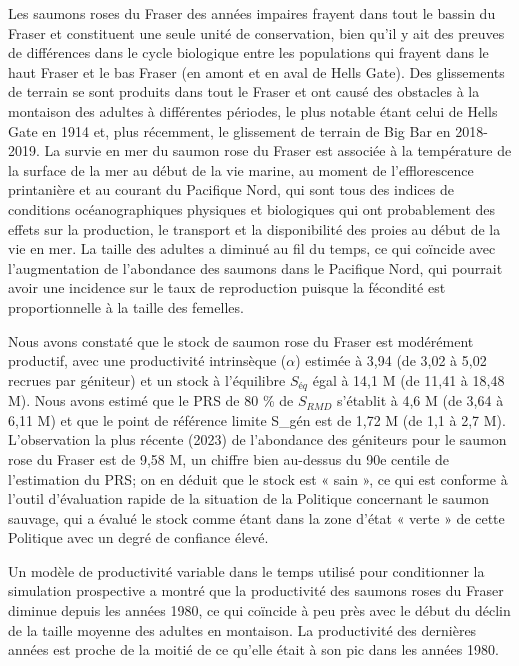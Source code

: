 \documentclass[french,11pt]{book}
\begin{document}
Les saumons roses du Fraser des années impaires frayent dans tout le bassin du Fraser et constituent une seule unité de conservation, bien qu'il y ait des preuves de différences dans le cycle biologique entre les populations qui frayent dans le haut Fraser et le bas Fraser (en amont et en aval de Hells Gate). Des glissements de terrain se sont produits dans tout le Fraser et ont causé des obstacles à la montaison des adultes à différentes périodes, le plus notable étant celui de Hells Gate en 1914 et, plus récemment, le glissement de terrain de Big Bar en 2018-2019. La survie en mer du saumon rose du Fraser est associée à la température de la surface de la mer au début de la vie marine, au moment de l'efflorescence printanière et au courant du Pacifique Nord, qui sont tous des indices de conditions océanographiques physiques et biologiques qui ont probablement des effets sur la production, le transport et la disponibilité des proies au début de la vie en mer. La taille des adultes a diminué au fil du temps, ce qui coïncide avec l'augmentation de l'abondance des saumons dans le Pacifique Nord, qui pourrait avoir une incidence sur le taux de reproduction puisque la fécondité est proportionnelle à la taille des femelles.

Nous avons constaté que le stock de saumon rose du Fraser est modérément productif, avec une productivité intrinsèque (\(\alpha\)) estimée à 3,94 (de 3,02 à 5,02 recrues par géniteur) et un stock à l'équilibre \(S_{éq}\) égal à 14,1 M (de 11,41 à 18,48 M). Nous avons estimé que le PRS de 80 \% de \(S_{RMD}\) s'établit à 4,6 M (de 3,64 à 6,11 M) et que le point de référence limite S\_gén est de 1,72 M (de 1,1 à 2,7 M). L'observation la plus récente (2023) de l'abondance des géniteurs pour le saumon rose du Fraser est de 9,58 M, un chiffre bien au-dessus du 90e centile de l'estimation du PRS; on en déduit que le stock est « sain », ce qui est conforme à l'outil d'évaluation rapide de la situation de la Politique concernant le saumon sauvage, qui a évalué le stock comme étant dans la zone d'état « verte » de cette Politique avec un degré de confiance élevé.

Un modèle de productivité variable dans le temps utilisé pour conditionner la simulation prospective a montré que la productivité des saumons roses du Fraser diminue depuis les années 1980, ce qui coïncide à peu près avec le début du déclin de la taille moyenne des adultes en montaison. La productivité des dernières années est proche de la moitié de ce qu'elle était à son pic dans les années 1980.
\end{document}

